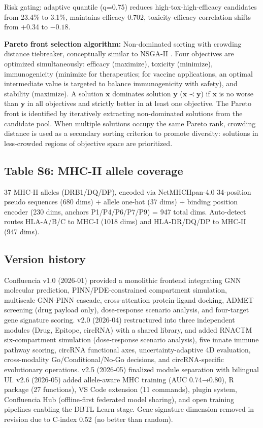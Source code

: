 Risk gating: adaptive quantile (q=0.75) reduces high-tox-high-efficacy candidates from 23.4\% to 3.1\%, maintains efficacy 0.702, toxicity-efficacy correlation shifts from +0.34 to $-0.18$.

\textbf{Pareto front selection algorithm:} Non-dominated sorting with crowding distance tiebreaker, conceptually similar to NSGA-II \citep{deb2002}. Four objectives are optimized simultaneously: efficacy (maximize), toxicity (minimize), immunogenicity (minimize for therapeutics; for vaccine applications, an optimal intermediate value is targeted to balance immunogenicity with safety), and stability (maximize). A solution $\mathbf{x}$ dominates solution $\mathbf{y}$ ($\mathbf{x} \prec \mathbf{y}$) if $\mathbf{x}$ is no worse than $\mathbf{y}$ in all objectives and strictly better in at least one objective. The Pareto front is identified by iteratively extracting non-dominated solutions from the candidate pool. When multiple solutions occupy the same Pareto rank, crowding distance is used as a secondary sorting criterion to promote diversity: solutions in less-crowded regions of objective space are prioritized.

\subsection*{Table S6: MHC-II allele coverage}

37 MHC-II alleles (DRB1/DQ/DP), encoded via NetMHCIIpan-4.0 34-position pseudo sequences (680 dims) + allele one-hot (37 dims) + binding position encoder (230 dims, anchors P1/P4/P6/P7/P9) = 947 total dims. Auto-detect routes HLA-A/B/C to MHC-I (1018 dims) and HLA-DR/DQ/DP to MHC-II (947 dims).

\subsection*{Version history}

Confluencia v1.0 (2026-01) provided a monolithic frontend integrating GNN molecular prediction, PINN/PDE-constrained compartment simulation, multiscale GNN-PINN cascade, cross-attention protein-ligand docking, ADMET screening (drug payload only), dose-response scenario analysis, and four-target gene signature scoring. v2.0 (2026-04) restructured into three independent modules (Drug, Epitope, circRNA) with a shared library, and added RNACTM six-compartment simulation (dose-response scenario analysis), five innate immune pathway scoring, circRNA functional axes, uncertainty-adaptive 4D evaluation, cross-modality Go/Conditional/No-Go decisions, and circRNA-specific evolutionary operations. v2.5 (2026-05) finalized module separation with bilingual UI. v2.6 (2026-05) added allele-aware MHC training (AUC 0.74→0.80), R package (27 functions), VS Code extension (11 commands), plugin system, Confluencia Hub (offline-first federated model sharing), and open training pipelines enabling the DBTL Learn stage. Gene signature dimension removed in revision due to C-index 0.52 (no better than random).

